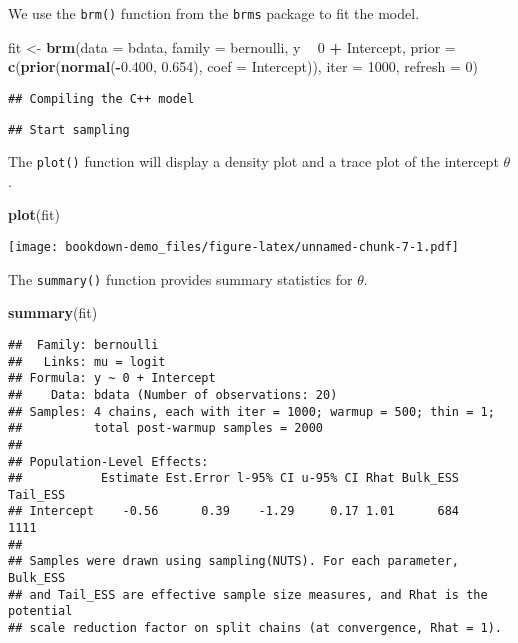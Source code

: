 \documentclass[
]{book}
\newenvironment{Shaded}{\begin{snugshade}}{\end{snugshade}}
\newcommand{\DataTypeTok}[1]{\textcolor[rgb]{0.13,0.29,0.53}{#1}}
\newcommand{\DecValTok}[1]{\textcolor[rgb]{0.00,0.00,0.81}{#1}}
\newcommand{\FloatTok}[1]{\textcolor[rgb]{0.00,0.00,0.81}{#1}}
\newcommand{\KeywordTok}[1]{\textcolor[rgb]{0.13,0.29,0.53}{\textbf{#1}}}
\newcommand{\NormalTok}[1]{#1}
\newcommand{\OperatorTok}[1]{\textcolor[rgb]{0.81,0.36,0.00}{\textbf{#1}}}
\newcommand{\StringTok}[1]{\textcolor[rgb]{0.31,0.60,0.02}{#1}}
\begin{document}
We use the \texttt{brm()} function from the \texttt{brms} package to fit the model.

\begin{Shaded}
\begin{Highlighting}[]
\NormalTok{fit <-}\StringTok{ }\KeywordTok{brm}\NormalTok{(}\DataTypeTok{data =}\NormalTok{ bdata, }
            \DataTypeTok{family =}\NormalTok{ bernoulli,}
\NormalTok{            y  }\OperatorTok{~}\StringTok{ }\DecValTok{0} \OperatorTok{+}\StringTok{ }\NormalTok{Intercept,}
            \DataTypeTok{prior =} \KeywordTok{c}\NormalTok{(}\KeywordTok{prior}\NormalTok{(}\KeywordTok{normal}\NormalTok{(}\OperatorTok{-}\FloatTok{0.400}\NormalTok{, }\FloatTok{0.654}\NormalTok{), }
                           \DataTypeTok{coef =}\NormalTok{ Intercept)),}
            \DataTypeTok{iter =} \DecValTok{1000}\NormalTok{,}
            \DataTypeTok{refresh =} \DecValTok{0}\NormalTok{)}
\end{Highlighting}
\end{Shaded}

\begin{verbatim}
## Compiling the C++ model
\end{verbatim}

\begin{verbatim}
## Start sampling
\end{verbatim}

The \texttt{plot()} function will display a density plot and a trace plot of the intercept \(\theta\).

\begin{Shaded}
\begin{Highlighting}[]
\KeywordTok{plot}\NormalTok{(fit)}
\end{Highlighting}
\end{Shaded}

\texttt{[image: bookdown-demo\_files/figure-latex/unnamed-chunk-7-1.pdf]}

The \texttt{summary()} function provides summary statistics for \(\theta\).

\begin{Shaded}
\begin{Highlighting}[]
\KeywordTok{summary}\NormalTok{(fit)}
\end{Highlighting}
\end{Shaded}

\begin{verbatim}
##  Family: bernoulli 
##   Links: mu = logit 
## Formula: y ~ 0 + Intercept 
##    Data: bdata (Number of observations: 20) 
## Samples: 4 chains, each with iter = 1000; warmup = 500; thin = 1;
##          total post-warmup samples = 2000
## 
## Population-Level Effects: 
##           Estimate Est.Error l-95% CI u-95% CI Rhat Bulk_ESS Tail_ESS
## Intercept    -0.56      0.39    -1.29     0.17 1.01      684     1111
## 
## Samples were drawn using sampling(NUTS). For each parameter, Bulk_ESS
## and Tail_ESS are effective sample size measures, and Rhat is the potential
## scale reduction factor on split chains (at convergence, Rhat = 1).
\end{verbatim}
\end{document}
